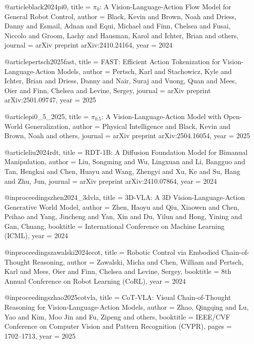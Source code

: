 @article{black2024pi0,
  title   = {$\pi_0$: A Vision-Language-Action Flow Model for General Robot Control},
  author  = {Black, Kevin and Brown, Noah and Driess, Danny and Esmail, Adnan
             and Equi, Michael and Finn, Chelsea and Fusai, Niccolo and
             Groom, Lachy and Hausman, Karol and Ichter, Brian and others},
  journal = {arXiv preprint arXiv:2410.24164},
  year    = {2024}
}

@article{pertsch2025fast,
  title   = {{FAST}: Efficient Action Tokenization for Vision-Language-Action Models},
  author  = {Pertsch, Karl and Stachowicz, Kyle and Ichter, Brian and Driess, Danny
             and Nair, Suraj and Vuong, Quan and Mees, Oier and Finn, Chelsea
             and Levine, Sergey},
  journal = {arXiv preprint arXiv:2501.09747},
  year    = {2025}
}

@article{pi0_5_2025,
  title   = {{$\pi_{0.5}$}: A Vision-Language-Action Model with Open-World Generalization},
  author  = {{Physical Intelligence} and Black, Kevin and Brown, Noah and others},
  journal = {arXiv preprint arXiv:2504.16054},
  year    = {2025}
}

@article{liu2024rdt,
  title   = {{RDT-1B}: A Diffusion Foundation Model for Bimanual Manipulation},
  author  = {Liu, Songming and Wu, Lingxuan and Li, Bangguo and Tan, Hengkai
             and Chen, Huayu and Wang, Zhengyi and Xu, Ke and Su, Hang and Zhu, Jun},
  journal = {arXiv preprint arXiv:2410.07864},
  year    = {2024}
}

@inproceedings{zhen2024_3dvla,
  title     = {{3D-VLA}: A 3D Vision-Language-Action Generative World Model},
  author    = {Zhen, Haoyu and Qiu, Xiaowen and Chen, Peihao and Yang, Jincheng
               and Yan, Xin and Du, Yilun and Hong, Yining and Gan, Chuang},
  booktitle = {International Conference on Machine Learning (ICML)},
  year      = {2024}
}

@inproceedings{zawalski2024ecot,
  title     = {Robotic Control via Embodied Chain-of-Thought Reasoning},
  author    = {Zawalski, Micha and Chen, William and Pertsch, Karl
               and Mees, Oier and Finn, Chelsea and Levine, Sergey},
  booktitle = {8th Annual Conference on Robot Learning (CoRL)},
  year      = {2024}
}

@inproceedings{zhao2025cotvla,
  title     = {{CoT-VLA}: Visual Chain-of-Thought Reasoning for Vision-Language-Action Models},
  author    = {Zhao, Qingqing and Lu, Yao and Kim, Moo Jin and Fu, Zipeng and others},
  booktitle = {IEEE/CVF Conference on Computer Vision and Pattern Recognition (CVPR)},
  pages     = {1702--1713},
  year      = {2025}
}

